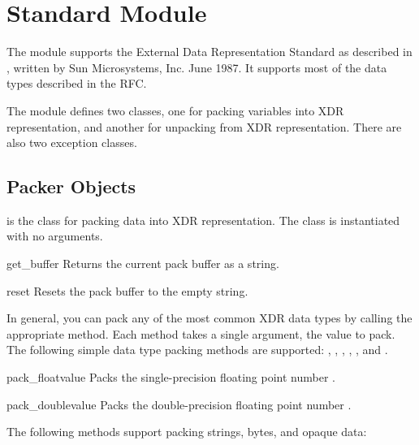 \section{Standard Module }
\label{module-xdrlib}



The  module supports the External Data Representation
Standard as described in , written by Sun Microsystems,
Inc. June 1987.  It supports most of the data types described in the
RFC.

The  module defines two classes, one for packing
variables into XDR representation, and another for unpacking from XDR
representation.  There are also two exception classes.


\subsection{Packer Objects}

 is the class for packing data into XDR representation.
The  class is instantiated with no arguments.

\begin{funcdesc}{get_buffer}{}
Returns the current pack buffer as a string.
\end{funcdesc}

\begin{funcdesc}{reset}{}
Resets the pack buffer to the empty string.
\end{funcdesc}

In general, you can pack any of the most common XDR data types by
calling the appropriate  method.  Each method
takes a single argument, the value to pack.  The following simple data
type packing methods are supported: , ,
, , ,
and .

\begin{funcdesc}{pack_float}{value}
Packs the single-precision floating point number .
\end{funcdesc}

\begin{funcdesc}{pack_double}{value}
Packs the double-precision floating point number .
\end{funcdesc}

The following methods support packing strings, bytes, and opaque data:


